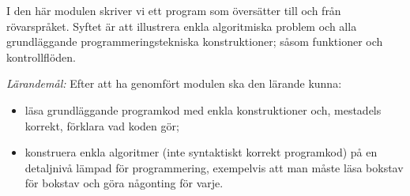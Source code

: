 
I den här modulen skriver vi ett program som översätter till och från 
rövarspråket.
Syftet är att illustrera enkla algoritmiska problem och alla grundläggande 
programmeringstekniska konstruktioner; såsom funktioner och kontrollflöden.

\emph{Lärandemål:}
Efter att ha genomfört modulen ska den lärande kunna:
\begin{itemize}
  \item läsa grundläggande programkod med enkla konstruktioner
    och, mestadels korrekt, förklara vad koden gör;
  \item konstruera enkla algoritmer (inte syntaktiskt korrekt programkod) på en 
    detaljnivå lämpad för programmering, exempelvis att man måste läsa bokstav 
    för bokstav och göra någonting för varje.
\end{itemize}
